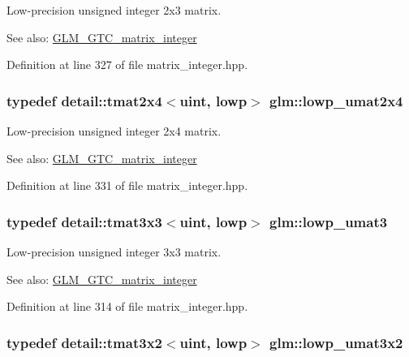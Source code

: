 Low-precision unsigned integer 2x3 matrix. \begin{Desc}
\item[See also:]\hyperlink{group__gtc__matrix__integer}{GLM\_\-GTC\_\-matrix\_\-integer} \end{Desc}


Definition at line 327 of file matrix\_\-integer.hpp.\hypertarget{group__gtc__matrix__integer_g581eef861234e918e88377fd331e37e6}{
\subsubsection[lowp\_\-umat2x4]{\setlength{\rightskip}{0pt plus 5cm}typedef detail::tmat2x4$<$uint, lowp$>$ {\bf glm::lowp\_\-umat2x4}}}
\label{group__gtc__matrix__integer_g581eef861234e918e88377fd331e37e6}


Low-precision unsigned integer 2x4 matrix. \begin{Desc}
\item[See also:]\hyperlink{group__gtc__matrix__integer}{GLM\_\-GTC\_\-matrix\_\-integer} \end{Desc}


Definition at line 331 of file matrix\_\-integer.hpp.\hypertarget{group__gtc__matrix__integer_g7160c0ac500826224d3baf1003c0432c}{
\subsubsection[lowp\_\-umat3]{\setlength{\rightskip}{0pt plus 5cm}typedef detail::tmat3x3$<$uint, lowp$>$ {\bf glm::lowp\_\-umat3}}}
\label{group__gtc__matrix__integer_g7160c0ac500826224d3baf1003c0432c}


Low-precision unsigned integer 3x3 matrix. \begin{Desc}
\item[See also:]\hyperlink{group__gtc__matrix__integer}{GLM\_\-GTC\_\-matrix\_\-integer} \end{Desc}


Definition at line 314 of file matrix\_\-integer.hpp.\hypertarget{group__gtc__matrix__integer_g5874e964b1816f230215df28d22ea7de}{
\subsubsection[lowp\_\-umat3x2]{\setlength{\rightskip}{0pt plus 5cm}typedef detail::tmat3x2$<$uint, lowp$>$ {\bf glm::lowp\_\-umat3x2}}}
\label{group__gtc__matrix__integer_g5874e964b1816f230215df28d22ea7de}


